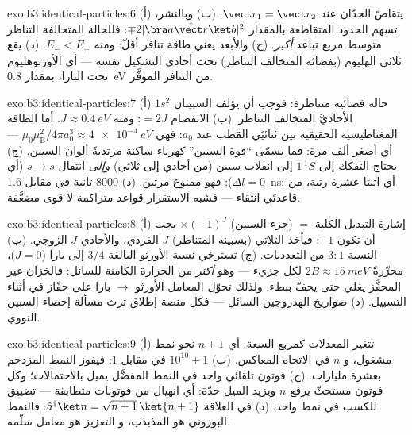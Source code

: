 \begin{solution}{exo:b3:identical-particles:6}
(أ) يتقاصّ الحدّان عند $\vect r_1 = \vect r_2$. (ب) وبالنشر،
تسهم الحدود المتقاطعة بالمقدار $\mp2|\bra a\hat{\vect r}\ket b|^2$:
فللحالة المتخالفة التناظر متوسط مربع تباعد \emph{أكبر}.
(ج) والأبعد يعني طاقة تنافر أقلّ: ومنه $E_- <
E_+$. (د) يقع ثلاثي الهليوم (بفضائه المتخالف التناظر) تحت
أحادي التشكيل نفسه --- أي الأورثوهليوم تحت البارا، بمقدار
\qty{0.8}{eV} من التنافر الموفَّر.
\end{solution}

\begin{solution}{exo:b3:identical-particles:7}
(أ) $1s^2$ حالة فضائية متناظرة: فوجب أن يؤلف السبينان
الأحاديَّ المتخالف التناظر. (ب) الانفصام $= 2J$: ومنه $J \approx
\qty{0.4}{eV}$. أما الطاقة المغناطيسية الحقيقية بين ثنائيَي القطب عند
$a_0$: فهي $\mu_0\mu_{\text{B}}^2/4\pi a_0^3 \approx \qty{4e-4}{eV}$
--- أي أصغر ألف مرة: فما يسمّى ``قوة السبين'' كهرباء ساكنة
مرتديةً ألوان السبين. (ج) يحتاج التفكك إلى $1\,^1S$ إلى انقلاب سبين
(من أحادي إلى ثلاثي) \emph{وإلى} انتقال $s \to s$ (أي $\Delta l =
0$): فهو ممنوع مرتين. (د) $8000$ ثانية في مقابل \qty{1.6}{ns}: أي اثنتا
عشرة رتبة، من قاعدتَي انتقاء --- فشبه الاستقرار قواعد
متراكمة لا قوى مضعَّفة.
\end{solution}

\begin{solution}{exo:b3:identical-particles:8}
(أ) إشارة التبديل الكلية $=$ (جزء السبين) $\times (-1)^J$ يجب أن تكون
$-1$: فيأخذ الثلاثي (بسبينه المتناظر) $J$ الفردي، والأحادي $J$ الزوجي.
(ب) النسبة $3:1$ من التعدديات. (ج) تسترخي نسبة الأورثو
البالغة 3/4 إلى بارا ($J = 0$)، محرِّرةً $2B \approx \qty{15}{meV}$
لكل جزيء --- وهو \emph{أكثر} من الحرارة الكامنة للسائل:
فالخزان غير المحفَّز يغلي حتى يجفّ ببطء. ولذلك تحوّل المعامل
الأورثو $\to$ بارا على حفّاز في أثناء التسييل. (د) صواريخ
الهدروجين السائل --- فكل منصة إطلاق ترث مسألة إحصاء
السبين النووي.
\end{solution}

\begin{solution}{exo:b3:identical-particles:9}
(أ) تتغير المعدلات كمربع السعة: أي $n + 1$ نحو نمط
مشغول، و $n$ في الاتجاه المعاكس. (ب) $10^{10} + 1$ في مقابل $1$: فيفوز
النمط المزدحم بعشرة مليارات. (ج) فوتون تلقائي واحد في
النمط المفضَّل يميل بالاحتمالات؛ وكل فوتون مستحثّ يرفع
$n$ ويزيد الميل حدّة: أي انهيال من فوتونات متطابقة ---
تضييق للكسب في نمط واحد. (د) في العلاقة $\hat a^\dagger\ket n =
\sqrt{n+1}\,\ket{n+1}$: فالنمط البوزوني هو المذبذب، و
التعزيز هو معامل سلّمه.
\end{solution}

